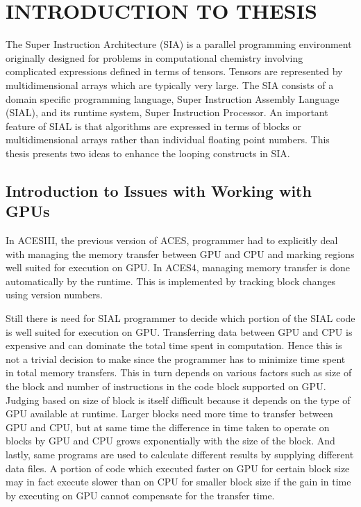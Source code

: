 \chapter{INTRODUCTION TO THESIS}\label{intro}
The Super Instruction Architecture (SIA) is a parallel programming environment
originally designed for problems in computational chemistry involving complicated
expressions defined in terms of tensors. Tensors are represented by
multidimensional arrays which are typically very large. The SIA consists of a
domain specific programming language, Super Instruction Assembly Language
(SIAL), and its runtime system, Super Instruction Processor. An important
feature of SIAL is that algorithms are expressed in terms of blocks or
multidimensional arrays rather than individual floating point numbers. This thesis
presents two ideas to enhance the looping constructs in SIA.

\section{Introduction to Issues with Working with GPUs}
In ACESIII, the previous version of ACES, programmer had to explicitly deal with managing
the memory transfer between GPU and CPU and marking regions well suited for execution
on GPU. In ACES4, managing memory transfer is done automatically by the runtime.
This is implemented by tracking block changes using version numbers.

Still there is need for SIAL programmer to decide which portion of the SIAL code
is well suited for execution on GPU. Transferring data between GPU and CPU is
expensive and can dominate the total time spent in computation. Hence this is not
a trivial decision to make since the programmer has to minimize time spent in
total memory transfers. This in turn depends on various factors such as
size of the block and number of instructions in the code block supported on GPU. Judging
based on size of block is itself difficult because it depends on the type of GPU available
at runtime. Larger blocks need more time to transfer between GPU and CPU, but at
same time the difference in time taken to operate on blocks by GPU and CPU grows
exponentially with the size of the block. And lastly, same programs are used to
calculate different results by supplying different data files. A portion of code
which executed faster on GPU for certain block size may in fact execute slower
than on CPU for smaller block size if the gain in time by executing on GPU cannot
compensate for the transfer time.

